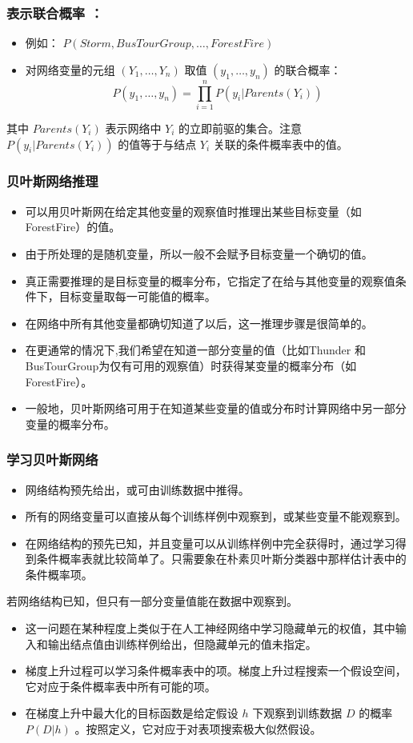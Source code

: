 \documentclass{beamer}
\begin{document}
\begin{frame}
\frametitle{表示联合概率 ：}
\label{sec-8-6}

\begin{itemize}
\item 例如： $P(Storm, BusTourGroup, \ldots, ForestFire)$
\item 对网络变量的元组 $(Y_1, \ldots, Y_n)$ 取值 $(y_1, \ldots, y_n)$ 的联合概率：
   $$P(y_1, \ldots, y_n) = \prod_{i=1}^{n} P(y_i | Parents(Y_i))$$
\end{itemize}
其中 $Parents(Y_i)$ 表示网络中 $Y_i$ 的立即前驱的集合。注意 $P(y_i|Parents(Y_i))$ 的值等于与结点 $Y_i$ 关联的条件概率表中的值。
\end{frame}
\begin{frame}
\frametitle{贝叶斯网络推理}
\label{sec-8-7}


\begin{itemize}
\item 可以用贝叶斯网在给定其他变量的观察值时推理出某些目标变量（如ForestFire）的值。
\item 由于所处理的是随机变量，所以一般不会赋予目标变量一个确切的值。
\item 真正需要推理的是目标变量的概率分布，它指定了在给与其他变量的观察值条件下，目标变量取每一可能值的概率。
\item 在网络中所有其他变量都确切知道了以后，这一推理步骤是很简单的。
\item 在更通常的情况下,我们希望在知道一部分变量的值（比如Thunder 和BusTourGroup为仅有可用的观察值）时获得某变量的概率分布（如ForestFire）。
\item 一般地，贝叶斯网络可用于在知道某些变量的值或分布时计算网络中另一部分变量的概率分布。
\end{itemize}
\end{frame}
\begin{frame}
\frametitle{学习贝叶斯网络}
\label{sec-8-8}


\begin{itemize}
\item 网络结构预先给出，或可由训练数据中推得。
\item 所有的网络变量可以直接从每个训练样例中观察到，或某些变量不能观察到。
\item 在网络结构的预先已知，并且变量可以从训练样例中完全获得时，通过学习得到条件概率表就比较简单了。只需要象在朴素贝叶斯分类器中那样估计表中的条件概率项。
\end{itemize}

若网络结构已知，但只有一部分变量值能在数据中观察到。
\begin{itemize}
\item 这一问题在某种程度上类似于在人工神经网络中学习隐藏单元的权值，其中输入和输出结点值由训练样例给出，但隐藏单元的值未指定。
\item 梯度上升过程可以学习条件概率表中的项。梯度上升过程搜索一个假设空间，它对应于条件概率表中所有可能的项。
\item 在梯度上升中最大化的目标函数是给定假设 $h$ 下观察到训练数据 $D$ 的概率 $P(D|h)$ 。按照定义，它对应于对表项搜索极大似然假设。
\end{itemize}
\end{frame}
\end{document}
